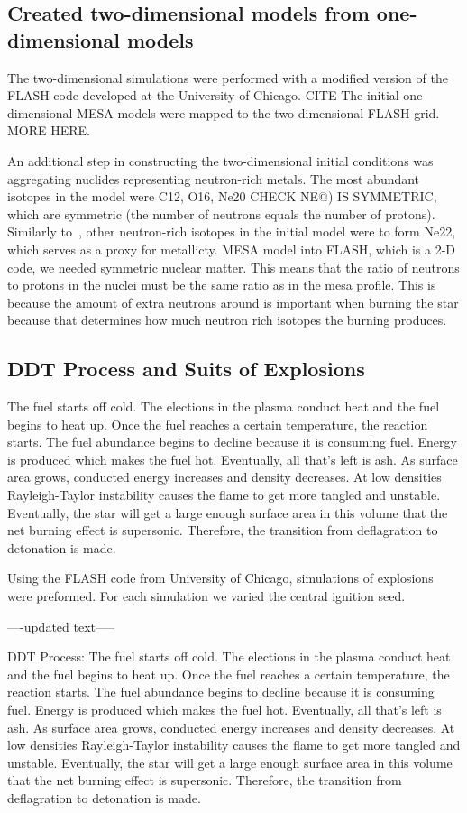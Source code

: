 \documentclass[iop,apj]{emulateapj}
\begin{document}
\subsection{Created two-dimensional models from one-dimensional models}

The two-dimensional simulations were performed with a modified version
of the FLASH code developed at the University of Chicago. CITE
The initial one-dimensional MESA models were mapped to the two-dimensional 
FLASH grid. MORE HERE.

An additional step in constructing the two-dimensional initial conditions
was aggregating nuclides representing neutron-rich metals. 
The most abundant isotopes in the model were C12, O16,
Ne20 CHECK NE@) IS SYMMETRIC, which are symmetric (the number of neutrons 
equals the number of protons). Similarly to~\citet{willcoxetal2016}, other 
neutron-rich isotopes in
the initial model were to form Ne22, which serves as a proxy for metallicty. 
MESA model into FLASH, which is a 2-D code, we needed symmetric nuclear
matter. This means that the ratio of neutrons to protons in the nuclei
must be the same ratio as in the mesa profile. This is because the amount
of extra neutrons around is important when burning the star because that
determines how much neutron rich isotopes the burning produces.

\subsection{DDT Process and Suits of Explosions}

The fuel starts off cold. The elections in the plasma conduct heat and the
fuel begins to heat up. Once the fuel reaches a certain temperature, the
reaction starts. The fuel abundance begins to decline because it is consuming
fuel. Energy is produced which makes the fuel hot. Eventually, all that’s
left is ash. As surface area grows, conducted energy increases and density
decreases. At low densities Rayleigh-Taylor instability causes the flame to
get more tangled and unstable. Eventually, the star will get a large enough
surface area in this volume that the net burning effect is supersonic.
Therefore, the transition from deflagration to detonation is made. 

Using the FLASH code from University of Chicago, simulations of
explosions were preformed. For each simulation we varied the central
ignition seed. 

----updated text-----

DDT Process:
The fuel starts off cold. The elections in the plasma conduct heat
and the fuel begins to heat up. Once the fuel reaches a certain
temperature, the reaction starts. The fuel abundance begins to
decline because it is consuming fuel. Energy is produced which
makes the fuel hot. Eventually, all that’s left is ash. As
surface area grows, conducted energy increases and density
decreases. At low densities Rayleigh-Taylor instability causes
the flame to get more tangled and unstable. Eventually, the
star will get a large enough surface area in this volume that
the net burning effect is supersonic. Therefore, the transition
from deflagration to detonation is made.
\end{document}
